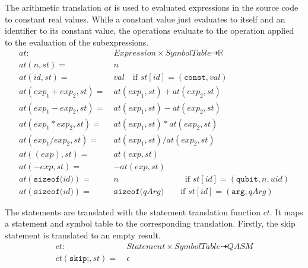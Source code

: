 The arithmetic translation $at$ is used to evaluated expressions in the source code to constant real values. While a constant value just evaluates to itself and an identifier to its constant value, the operations evaluate to the operation applied to the evaluation of the subexpressions. 
\begin{align*}
    at : \ & Expression \times SymbolTable \dashrightarrow \mathbb{R}\\
    at(n, st) = \ & n\\
    at(id, st) = \ & val \quad \text{if } st[id] = (\texttt{const}, val)\\
    at(exp_1 + exp_2, st) = \ & at(exp_1, st) + at(exp_2, st)\\
    at(exp_1 - exp_2, st) = \ & at(exp_1, st) - at(exp_2, st)\\
    at(exp_1 * exp_2, st) = \ & at(exp_1, st) * at(exp_2, st)\\
    at(exp_1 / exp_2, st) = \ & at(exp_1, st) / at(exp_2, st)\\
    at((exp), st) = \ & at(exp, st)\\
    at(-exp, st) = \ & -at(exp, st)\\
    at(\texttt{sizeof(} id \texttt{)}) = \ & n \hspace{8em} \text{if } st[id] = (\texttt{qubit}, n, uid)\\
    at(\texttt{sizeof(} id \texttt{)}) = \ & \texttt{sizeof(} qArg \texttt{)} \texttt \quad \quad \text{if } st[id] = (\texttt{arg}, qArg)
\end{align*}

The statements are translated with the statement translation function $ct$. It maps a statement and symbol table to the corresponding translation. Firstly, the skip statement is translated to an empty result.
\begin{align*}
    ct : \ & Statement \times SymbolTable \dashrightarrow QASM\\
    ct(\texttt{skip;}, st) = \ & \epsilon
\end{align*}

